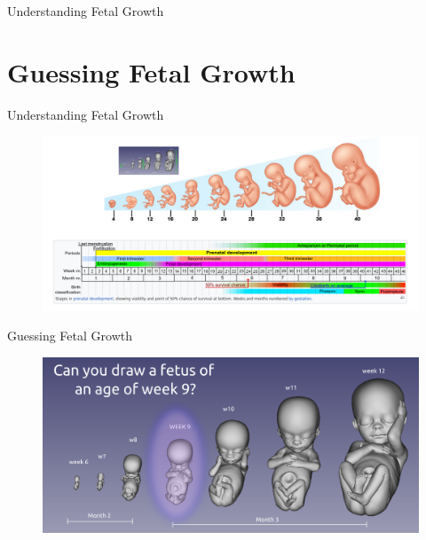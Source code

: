 

{
\begin{frame}{}

\BigSizeFont
Understanding Fetal Growth
\end{frame}
}




\section{Guessing Fetal Growth}



{
\begin{frame}{Understanding Fetal Growth}
      \begin{figure}
        \centering
        \includegraphics[width=1.0\textwidth]{./figures/fetal-growth/versions/drawing-v01v01.png}
      \end{figure}
\end{frame}
}


{
\begin{frame}{Guessing Fetal Growth}
      \begin{figure}
        \centering
        \includegraphics[width=1.0\textwidth]{./figures/fetal-growth/versions/drawing-v02.png}
      \end{figure}
\end{frame}
}




